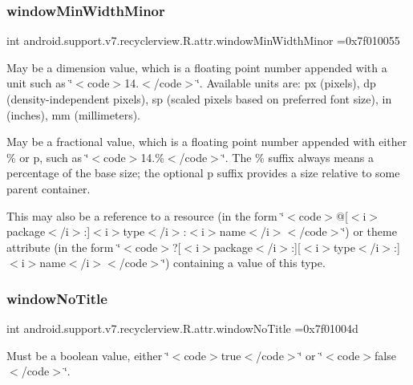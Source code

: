 \subsubsection{\texorpdfstring{window\+Min\+Width\+Minor}{windowMinWidthMinor}}
{\footnotesize\ttfamily int android.\+support.\+v7.\+recyclerview.\+R.\+attr.\+window\+Min\+Width\+Minor =0x7f010055\hspace{0.3cm}{\ttfamily [static]}}

May be a dimension value, which is a floating point number appended with a unit such as \char`\"{}$<$code$>$14.\+5sp$<$/code$>$\char`\"{}. Available units are\+: px (pixels), dp (density-\/independent pixels), sp (scaled pixels based on preferred font size), in (inches), mm (millimeters). 

May be a fractional value, which is a floating point number appended with either \% or p, such as \char`\"{}$<$code$>$14.\%$<$/code$>$\char`\"{}. The \% suffix always means a percentage of the base size; the optional p suffix provides a size relative to some parent container. 

This may also be a reference to a resource (in the form \char`\"{}$<$code$>$@\mbox{[}$<$i$>$package$<$/i$>$\+:\mbox{]}$<$i$>$type$<$/i$>$\+:$<$i$>$name$<$/i$>$$<$/code$>$\char`\"{}) or theme attribute (in the form \char`\"{}$<$code$>$?\mbox{[}$<$i$>$package$<$/i$>$\+:\mbox{]}\mbox{[}$<$i$>$type$<$/i$>$\+:\mbox{]}$<$i$>$name$<$/i$>$$<$/code$>$\char`\"{}) containing a value of this type. \mbox{\label{classandroid_1_1support_1_1v7_1_1recyclerview_1_1R_1_1attr_ad6cd604a9df8182704ee2296b32ab653}} 
\subsubsection{\texorpdfstring{window\+No\+Title}{windowNoTitle}}
{\footnotesize\ttfamily int android.\+support.\+v7.\+recyclerview.\+R.\+attr.\+window\+No\+Title =0x7f01004d\hspace{0.3cm}{\ttfamily [static]}}

Must be a boolean value, either \char`\"{}$<$code$>$true$<$/code$>$\char`\"{} or \char`\"{}$<$code$>$false$<$/code$>$\char`\"{}. 

